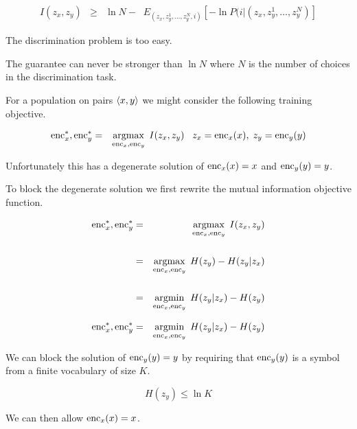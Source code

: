 {

{\huge
\begin{eqnarray*}
I(z_x,z_y) & \geq & \ln N - \;\;E_{(z_x,z_y^1,\ldots,z_y^N,i)}\left[-\ln P(i|(z_x,z_y^1,\ldots,z_y^N)\right]
\end{eqnarray*}
}

The discrimination problem is too easy.

\vfill
The guarantee can never be stronger than $\ln N$ where $N$ is the number of choices in the discrimination task.


For a population on pairs ${\mbox{$\langle x,y\rangle$}}$ we might consider the following training objective.

\vfill
\begin{eqnarray*}
\mathrm{enc}_x^*,\mathrm{enc}_y^* & = & \operatorname*{argmax}_{\mathrm{enc}_x,\mathrm{enc}_y} \; I(z_x,z_y) \;\;\;z_x = \mathrm{enc}_x(x),\;z_y = \mathrm{enc}_y(y)
\end{eqnarray*}

\vfill
Unfortunately this has a degenerate solution of $\mathrm{enc}_x(x) = x$ and $\mathrm{enc}_y(y) = y$.


To block the degenerate solution we first rewrite the mutual information objective function.

\vfill
\begin{eqnarray*}
\mathrm{enc}_x^*,\mathrm{enc}_y^* & = & \operatorname*{argmax}_{\mathrm{enc}_x,\mathrm{enc}_y} \; I(z_x,z_y) \\
\\
&= & \operatorname*{argmax}_{\mathrm{enc}_x,\mathrm{enc}_y}\; H(z_y) - H(z_y|z_x) \\
\\
&= & \operatorname*{argmin}_{\mathrm{enc}_x,\mathrm{enc}_y}\; H(z_y|z_x) - H(z_y)
\end{eqnarray*}


\begin{eqnarray*}
\mathrm{enc}_x^*,\mathrm{enc}_y^* & = &  \operatorname*{argmin}_{\mathrm{enc}_x,\mathrm{enc}_y}\; H(z_y|z_x) - H(z_y)
\end{eqnarray*}

\vfill
We can block the solution of $\mathrm{enc}_y(y) = y$ by requiring that $\mathrm{enc}_y(y)$ is a symbol from a finite vocabulary of size $K$.

$$H(z_y) \leq \ln K$$

\vfill
We can then allow $\mathrm{enc}_x(x) = x$.


}
